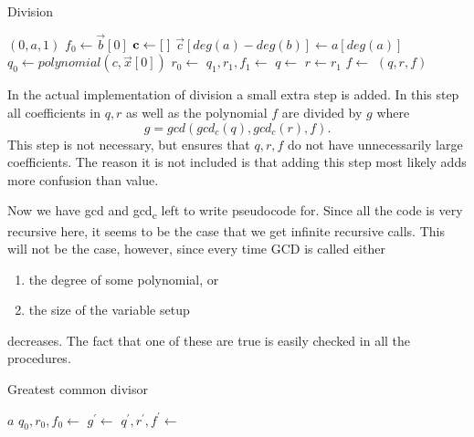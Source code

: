 \begin{algorithm}[H]
  \caption{Division}
  \begin{algorithmic}[1]
        \State \Return $(0,a,1)$
      \EndIf
      \State $f_0\gets \vec{b}[0]$
      \State $\mathbf{c}\gets [\hspace*{1mm}]$
      \State $\vec{c}[deg(a)-deg(b)]\gets a[deg(a)]$
      \State $q_0\gets polynomial(c,\vec{x}[0])$
      \State $r_0\gets$ 
      \State $q_1,r_1,f_1 \gets$ 
      \State $q\gets $ 
      \State $r\gets r_1$
      \State $f\gets$ 
      \State \Return $(q,r,f)$
    \EndProcedure
  \end{algorithmic}
\end{algorithm}
\begin{remark}
  In the actual implementation of division a small extra step is added. In this step all coefficients in $q,r$ as well as the polynomial $f$ are divided by $g$ where
  \begin{equation}
    g = gcd(gcd_c(q),gcd_c(r),f).
  \end{equation}
  This step is not necessary, but ensures that $q,r,f$ do not have unnecessarily large coefficients. The reason it is not included is that adding this step most likely adds more confusion than value.
\end{remark}
Now we have gcd and gcd\textsubscript{c} left to write pseudocode for. Since all the code is very recursive here, it seems to be the case that we get infinite recursive calls. This will not be the case, however, since every time GCD is called either
\begin{enumerate}
  \item the degree of some polynomial, or
  \item the size of the variable setup
\end{enumerate}
decreases. The fact that one of these are true is easily checked in all the procedures.
\begin{algorithm}[H]
  \caption{Greatest common divisor}
  \begin{algorithmic}[1]
        \State \Return $a$
      \EndIf
      \State $q_0,r_0,f_0\gets$ 
      \State $g^\prime\gets$ 
      \State $q^\prime,r^\prime,f^\prime\gets$ 
      \State \Return {}
    \EndProcedure
  \end{algorithmic}
\end{algorithm}
